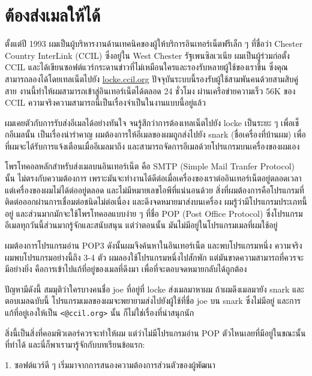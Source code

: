 \chapter{ต้องส่งเมลให้ได้}

ตั้งแต่ปี 1993
ผมเป็นผู้บริหารงานด้านเทคนิคของผู้ให้บริการอินเทอร์เน็ตฟรีเล็ก ๆ
ที่ชื่อว่า Chester Country InterLink (CCIL) ซึ่งอยู่ใน West Chester
รัฐเพนซิลเวเนีย ผมเป็นผู้ร่วมก่อตั้ง CCIL
และได้เขียนซอฟต์แวร์กระดานข่าวที่ไม่เหมือนใครและรองรับหลายผู้ใช้ของเราขึ้น
ซึ่งคุณสามารถลองได้โดยเทลเน็ตไปยัง
\href{telnet://locke.ccil.org}{locke.ccil.org}
ปัจจุบันระบบนี้รองรับผู้ใช้สามพันคนด้วยสามสิบคู่สาย
งานนี้ทำให้ผมสามารถเข้าสู่อินเทอร์เน็ตได้ตลอด 24 ชั่วโมง
ผ่านเครือข่ายความเร็ว 56K ของ CCIL
ความจริงความสามารถนี้เป็นเรื่องจำเป็นในงานแบบนี้อยู่แล้ว

ผมเคยตัวกับการรับส่งอีเมลได้อย่างทันใจ จนรู้สึกว่าการต้องเทลเน็ตไปยัง
locke เป็นระยะ ๆ  เพื่อเช็กอีเมลนั้น เป็นเรื่องน่ารำคาญ
ผมต้องการให้อีเมลของผมถูกส่งไปยัง snark (ชื่อเครื่องที่บ้านผม)
เพื่อที่ผมจะได้รับการแจ้งเตือนเมื่ออีเมลมาถึง
และสามารถจัดการอีเมลด้วยโปรแกรมบนเครื่องของผมเอง

โพรโทคอลหลักสำหรับส่งเมลบนอินเทอร์เน็ต คือ SMTP (Simple Mail Tranfer
Protocol) นั้น ไม่ตรงกับความต้องการ
เพราะมันจะทำงานได้ดีต่อเมื่อเครื่องของเราต่ออินเทอร์เน็ตอยู่ตลอดเวลา
แต่เครื่องของผมไม่ได้ต่ออยู่ตลอด และไม่มีหมายเลขไอพีที่แน่นอนด้วย
สิ่งที่ผมต้องการคือโปรแกรมที่ติดต่อออกผ่านการเชื่อมต่อชนิดไม่ต่อเนื่อง
และดึงจดหมายมาส่งบนเครื่อง ผมรู้ว่ามีโปรแกรมประเภทนี้อยู่
และส่วนมากมักจะใช้โพรโทคอลแบบง่าย ๆ  ที่ชื่อ POP (Post Office Protocol)
ซึ่งโปรแกรมอีเมลทุกวันนี้ส่วนมากรู้จักและสนับสนุน แต่ว่าตอนนั้น
มันไม่มีอยู่ในโปรแกรมเมลที่ผมใช้อยู่

ผมต้องการโปรแกรมอ่าน POP3 ดังนั้นผมจึงค้นหาในอินเทอร์เน็ต
และพบโปรแกรมหนึ่ง ความจริงผมพบโปรแกรมอย่างนี้ถึง 3-4 ตัว
ผมลองใช้โปรแกรมหนึ่งไปสักพัก แต่มันขาดความสามารถที่ควรจะมีอย่างยิ่ง
คือการเข้าไปแก้ที่อยู่ของเมลที่ดึงมา เพื่อที่จะตอบจดหมายกลับได้ถูกต้อง

ปัญหามีดังนี้ สมมุติว่าใครบางคนชื่อ joe ที่อยู่ที่ locke ส่งเมลมาหาผม
ถ้าผมดึงเมลมายัง snark และตอบเมลฉบับนี้
โปรแกรมเมลของผมจะพยายามส่งไปยังผู้ใช้ที่ชื่อ joe บน snark ซึ่งไม่มีอยู่
และการแก้ที่อยู่เองให้เป็น \texttt{\textless{}@ccil.org\textgreater{}}
นั้น ก็ไม่ใช่เรื่องที่น่าสนุกนัก

สิ่งนี้เป็นสิ่งที่คอมพิวเตอร์ควรจะทำให้ผม แต่ว่าไม่มีโปรแกรมอ่าน POP
ตัวไหนเลยที่มีอยู่ในขณะนั้นที่ทำได้
และนี่ก็พาเรามารู้จักกับบทเรียนข้อแรก:

\begin{fancyquotes}
  1. ซอฟต์แวร์ดี ๆ  เริ่มมาจากการสนองความต้องการส่วนตัวของผู้พัฒนา
\end{fancyquotes}

